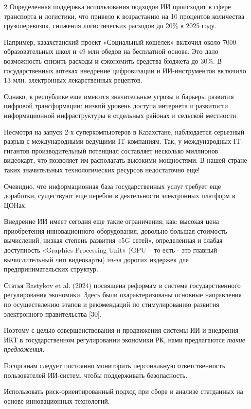 \begin{multicols}{2}
Определенная поддержка использования подходов ИИ происходит в сфере
транспорта и логистики, что привело к возрастанию на 10 процентов
количества грузоперевозок, снижения логистических расходов до 20\% в
2025 году.

Например, казахстанский проект «Социальный кошелек» включил около 7000
образовательных школ и 49 млн обедов на бесплатной основе. Это дало
возможность снизить расходы и сэкономить средства бюджета до 30\%.
В государственных аптеках внедрение цифровизации и ИИ-инструментов
включило 13 млн. электронных лекарственных рецептов.

Однако, в республике еще имеются значительные угрозы и барьеры развития
цифровой трансформации: низкий уровень доступа интернета и развитости
информационной инфраструктуры в отдельных районах и сельской местности.

Несмотря на запуск 2-х суперкомпьютеров в Казахстане, наблюдается
серьезный разрыв с международными ведущими IT-компаниям. Так,
у международных IT-гигантов производительный потенциал
составляет несколько миллионов видеокарт, что позволяет им располагать
высокими мощностями. В нашей стране таких значительных технологических
ресурсов недостаточно еще!

Очевидно, что информационная база государственных услуг требует еще
доработки, существуют еще перебои в деятельности электронных платформ
в ЦОНах.

Внедрение ИИ имеет сегодня еще такие ограничения, как: высокая цена
приобретения инновационного оборудования, довольно большая стоимость
вычислений, низкая степень развития «5G сетей», определенная и слабая
доступность «Graphics Processing Unit» (GPU -- то есть - это главный
вычислительный чип видеокарты) из-за дорогих издержек для
предпринимательских структур.

Статья Bastykov et al. (2024) посвящена реформам в системе
государственного регулирования экономики. Здесь были охарактеризованы
основные направления по осуществлению этапов и рекомендаций по
стимулированию развития электронного правительства {[}30{]}.

Поэтому с целью совершенствования и продвижения системы ИИ и внедрения
ИКТ в государственном регулировании экономики РК, нами предлагаются
\emph{такие предложения}.

Госорганам следует постоянно мониторить персональную ответственность
пользователей ИИ-систем, чтобы поддерживать безопасность.

Использовать риск-ориентированный подход при сборе и анализе статданных
на основе инновационных технологий.


\end{multicols}
